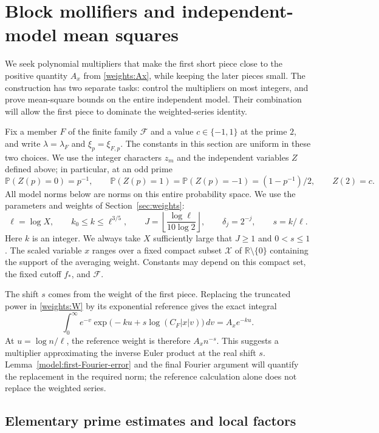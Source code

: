 \section{Block mollifiers and independent-model mean squares}
\label{sec:model}
\label{model:section}

We seek polynomial multipliers that make the first short piece close
to the positive quantity $A_x$ from \eqref{weights:Ax}, while keeping
the later pieces small. The construction has two separate tasks:
control the multipliers on most integers, and prove mean-square bounds
on the entire independent model. Their combination will allow the
first piece to dominate the weighted-series identity.

Fix a member $F$ of the finite family $\mathcal F$ and a value
$c\in\{-1,1\}$ at the prime $2$, and write $\lambda=\lambda_F$ and $\xi_p=\xi_{F,p}$.
The constants in this section are uniform in these two choices.  We use
the integer characters $z_m$ and the independent variables $Z$ defined
above; in particular, at an odd prime
\[
 \mathbb P(Z(p)=0)=p^{-1},\qquad
 \mathbb P(Z(p)=1)=\mathbb P(Z(p)=-1)=(1-p^{-1})/2,
 \qquad Z(2)=c.
\]
All model norms below are norms on this entire probability space.
We use the parameters and weights of Section~\ref{sec:weights}:
\[
 \ell=\log X,\qquad k_0\le k\le\ell^{3/5},\qquad
 J=\left\lfloor\frac{\log\ell}{10\log2}\right\rfloor,
 \qquad \delta_j=2^{-j},\qquad s=k/\ell.
\]
Here $k$ is an integer.  We always take $X$ sufficiently large that
$J\ge1$ and $0<s\le1$.  The scaled variable $x$ ranges over a fixed
compact subset $\mathcal X$ of $\mathbb R\setminus\{0\}$ containing the
support of the averaging weight.  Constants may depend on this compact
set, the fixed cutoff $f_*$, and $\mathcal F$.

The shift $s$ comes from the weight of the first piece. Replacing the
truncated power in \eqref{weights:W} by its exponential reference gives
the exact integral
\[
 \int_0^\infty e^{-v}
       \exp\bigl(-ku+s\log(C_F|x|v)\bigr)\,dv
       =A_xe^{-ku}.
\]
At $u=\log n/\ell$, the reference weight is therefore $A_xn^{-s}$.
This suggests a multiplier approximating the inverse Euler product at
the real shift $s$. Lemma~\ref{model:first-Fourier-error} and the final
Fourier argument will quantify the replacement in the required norm;
the reference calculation alone does not replace the weighted series.

\subsection{Elementary prime estimates and local factors}

